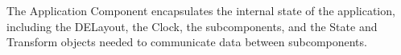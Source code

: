 %


The Application Component encapsulates the internal state of the
application, including the DELayout, the Clock, the subcomponents,
and the State and Transform objects needed to communicate data
between subcomponents.


